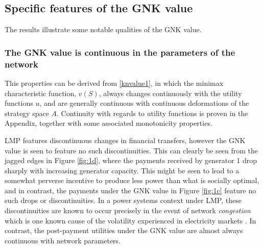 \subsection{Specific features of the GNK value}
The results illustrate some notable qualities of the GNK value.


\subsubsection*{The GNK value is continuous in the parameters of the network}
This properties can be derived from \eqref{knvalue1}, in which the minimax characteristic function, $v(S)$,
always changes continuously with the utility functions $u$, and are generally continuous with continuous deformations of the strategy space $A$.
Continuity with regards to utility functions is proven in the Appendix, together with some associated monotonicity properties.

LMP features discontinuous changes in financial transfers, however the GNK value is seen to feature no such discontinuities.
This can clearly be seen from the jagged edges in Figure \ref{fig:1d}, where the payments received by generator 1 drop sharply with increasing generator capacity. 
This might be seen to lead to a somewhat perverse incentive to produce less power than what is socially optimal, and in contrast, the payments under the GNK value in Figure \ref{fig:1c} feature no such drops or discontinuities.
In a power systems context under LMP, these discontinuities are known to occur precisely in the event of network \emph{congestion}
which is one known cause of the volatility experienced in
electricity markets \cite{RePEc:aen:journl:2006v27-02-a09}. 
In contrast, the post-payment utilities under the GNK value are almost always continuous with network parameters.



